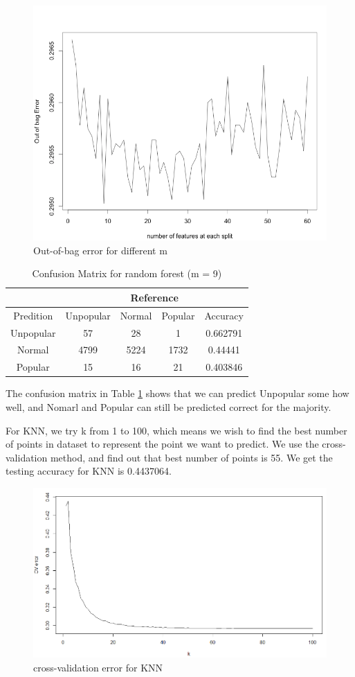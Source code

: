 \documentclass[11pt]{article}
\begin{document}
    \begin{figure}[h]
        \centering
        \includegraphics[width=0.7\linewidth]{randomforest_oob.png}
        \caption{Out-of-bag error for different m}
    \end{figure}
    
    \begin{table}[h]
        \centering
        \caption{Confusion Matrix for random forest (m = 9)}
        \begin{tabular}{ c | c | c | c | c }
            \hline\hline
            \multicolumn{1}{l}{} & \multicolumn{4}{c}{Reference} \\
            \hline
            Predition & Unpopular & Normal & Popular & Accuracy\\
            \hline
            Unpopular & 57 & 28 & 1 & 0.662791\\
            \hline
            Normal & 4799 & 5224 & 1732 & 0.44441\\
            \hline
            Popular & 15 & 16 & 21 & 0.403846\\
            \hline\hline
        \end{tabular}
        \label{table:rf}
    \end{table}

The confusion matrix in Table \ref{table:rf} shows that we can predict Unpopular some how well, and Nomarl and Popular can still be predicted correct for the majority.

For KNN, we try k from 1 to 100, which means we wish to find the best number of points in dataset to represent the point we want to predict. We use the cross-validation method, and find out that best number of points is 55. We get the testing accuracy for KNN is 0.4437064.

    \begin{figure}[h]
        \centering
        \includegraphics[width=0.7\linewidth]{knn_cv.png}
        \caption{cross-validation error for KNN}
    \end{figure}
\end{document}
